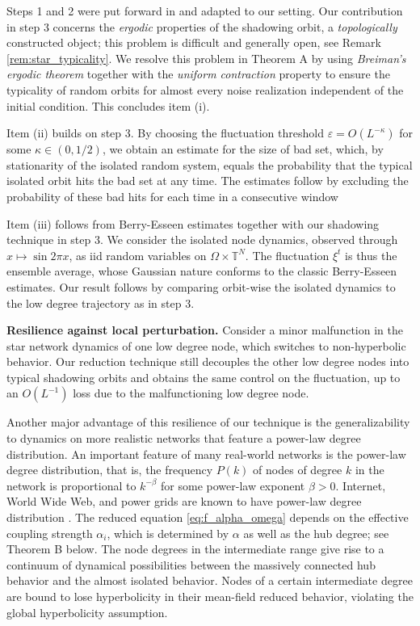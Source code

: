 \documentclass[a4paper]{article}
\theoremstyle{plain}
\theoremstyle{definition}
\newcommand{\T}{\mathbb{T}}
\begin{document}
Steps 1 and 2 were put forward in \cite{PvST20} and adapted to our setting. 
Our contribution in step 3 concerns 
the \textit{ergodic} properties of the shadowing orbit, a \textit{topologically} constructed object; this problem is difficult and generally open, see Remark \ref{rem:star_typicality}. We resolve this problem in Theorem A by using \textit{Breiman's ergodic theorem} together with the \textit{uniform contraction} property to ensure the typicality of random orbits for almost every noise realization independent of the initial condition. This concludes item (i).



{Item (ii) builds on step 3. By choosing the fluctuation threshold $\varepsilon=O(L^{-\kappa})$ for some $\kappa\in(0,1/2)$, we obtain an estimate for the size of bad set, which, by stationarity of the isolated random system, equals the probability that the typical isolated orbit hits the bad set at any time. The estimates follow by excluding the probability of these bad hits for each time in a consecutive window}

{Item (iii) follows from Berry-Esseen estimates together with our shadowing technique in step 3. We consider the isolated node dynamics, observed through $x\mapsto \sin 2\pi x$, as iid random variables on $\Omega\times \T^{N}$. The fluctuation $\xi^t$ is thus the ensemble average, whose Gaussian nature conforms to the classic Berry-Esseen estimates. Our result follows by comparing orbit-wise the isolated dynamics to the low degree trajectory as in step 3.}





\textbf{Resilience against local perturbation.} 
Consider a minor malfunction in the star network dynamics of one low degree node, which switches to non-hyperbolic behavior. Our reduction technique still decouples the other low degree nodes into typical shadowing orbits and obtains the same control on the fluctuation, up to an $O(L^{-1})$ loss due to the malfunctioning low degree node.

Another major advantage of this resilience of our technique is the generalizability to dynamics on more realistic networks that feature a power-law degree distribution. An important feature of many real-world networks is the power-law degree distribution, that is, the frequency $P(k)$ of nodes of degree $k$ in the network is proportional to $k^{-\beta}$ for some power-law exponent $\beta>0$.  Internet, World Wide Web, and power grids are known to have power-law degree distribution \cite{Chung_2006}. The reduced equation \ref{eq:f_alpha_omega} depends on the effective coupling strength $\alpha_i$, which is determined by $\alpha$ as well as the hub degree; see Theorem B below. The node degrees in the intermediate range give rise to a continuum of dynamical possibilities between the massively connected hub behavior and the almost isolated behavior. Nodes of a certain intermediate degree are bound to lose hyperbolicity in their mean-field reduced behavior, violating the global hyperbolicity assumption.
\end{document}
